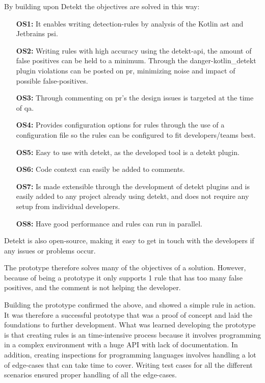 \documentclass{report}
\begin{document}
By building upon Detekt the objectives are solved in this way:
\begin{itemize}
    \item [\textbf{OS1:}] It enables writing detection-rules by analysis of the Kotlin \gls{ast} and Jetbrains \gls{psi}.
    
    \item [\textbf{OS2:}] Writing rules with high accuracy using the detekt-api, the amount of false positives can be held to a minimum. Through the danger-kotlin\_detekt plugin violations can be posted on \gls{pr}, minimizing noise and impact of possible false-positives.
    
    \item [\textbf{OS3:}] Through commenting on \gls{pr}'s the design issues is targeted at the time of \gls{qa}.
    
    \item [\textbf{OS4:}] Provides configuration options for rules through the use of a configuration file so the rules can be configured to fit developers/teams best.
    
    \item [\textbf{OS5:}] Easy to use with detekt, as the developed tool is a detekt plugin.
    
    \item [\textbf{OS6:}] Code context can easily be added to comments.
    
    \item [\textbf{OS7:}] Is made extensible through the development of detekt plugins and is easily added to any project already using detekt, and does not require any setup from individual developers.

    \item [\textbf{OS8:}] Have good performance and rules can run in parallel. 
\end{itemize}

Detekt is also open-source, making it easy to get in touch with the developers if any issues or problems occur.


The prototype therefore solves many of the objectives of a solution. However, because of being a prototype it only supports 1 rule that has too many false positives, and the comment is not helping the developer.


Building the prototype confirmed the above, and showed a simple rule in action. It was therefore a successful prototype that was a proof of concept and laid the foundations to further development. What was learned developing the prototype is that creating rules is an time-intensive process because it involves programming in a complex environment with a huge API with lack of documentation. In addition, creating inspections for programming languages involves handling a lot of edge-cases that can take time to cover. Writing test cases for all the different scenarios ensured proper handling of all the edge-cases.
\end{document}
